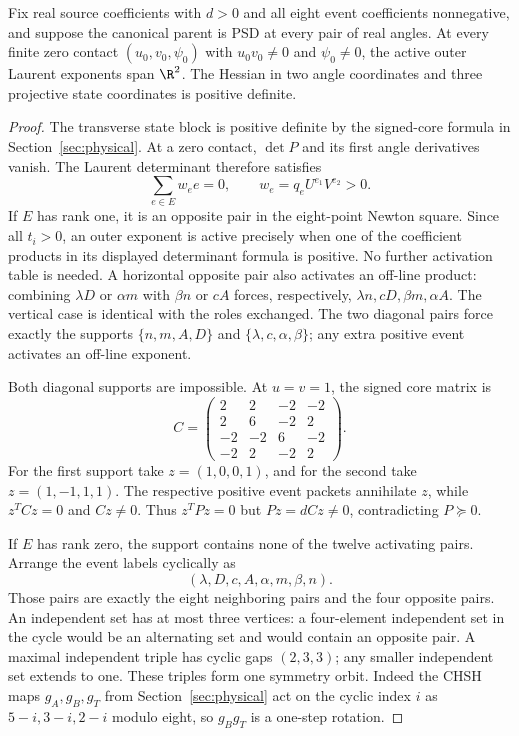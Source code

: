 \begin{theorem}\label{thm:curvature}
Fix real source coefficients with $d>0$ and all eight event coefficients nonnegative, and suppose the canonical parent is PSD at every pair of real angles. At every finite zero contact $(u_0,v_0,\psi_0)$ with $u_0v_0\ne0$ and $\psi_0\ne0$, the active outer Laurent exponents span $\R^2$. The Hessian in two angle coordinates and three projective state coordinates is positive definite.
\end{theorem}
\begin{proof}
The transverse state block is positive definite by the signed-core formula in Section~\ref{sec:physical}. At a zero contact, $\det P$ and its first angle derivatives vanish. The Laurent determinant therefore satisfies
\[
\sum_{e\in E}w_e e=0,\qquad w_e=q_eU^{e_1}V^{e_2}>0.
\]
If $E$ has rank one, it is an opposite pair in the eight-point Newton square. Since all $t_i>0$, an outer exponent is active precisely when one of the coefficient products in its displayed determinant formula is positive. No further activation table is needed.
A horizontal opposite pair also activates an off-line product: combining $\lambda D$ or $\alpha m$ with $\beta n$ or $cA$ forces, respectively, $\lambda n,cD,\beta m,\alpha A$. The vertical case is identical with the roles exchanged. The two diagonal pairs force exactly the supports $\{n,m,A,D\}$ and $\{\lambda,c,\alpha,\beta\}$; any extra positive event activates an off-line exponent.

Both diagonal supports are impossible. At $u=v=1$, the signed core matrix is
\[
C=\begin{pmatrix}2&2&-2&-2\\2&6&-2&2\\-2&-2&6&-2\\-2&2&-2&2\end{pmatrix}.
\]
For the first support take $z=(1,0,0,1)$, and for the second take $z=(1,-1,1,1)$. The respective positive event packets annihilate $z$, while $z^TCz=0$ and $Cz\ne0$. Thus $z^TPz=0$ but $Pz=dCz\ne0$, contradicting $P\succeq0$.

If $E$ has rank zero, the support contains none of the twelve activating pairs. Arrange the event labels cyclically as
\[
(\lambda,D,c,A,\alpha,m,\beta,n).
\]
Those pairs are exactly the eight neighboring pairs and the four opposite pairs. An independent set has at most three vertices: a four-element independent set in the cycle would be an alternating set and would contain an opposite pair. A maximal independent triple has cyclic gaps $(2,3,3)$; any smaller independent set extends to one. These triples form one symmetry orbit. Indeed the CHSH maps $g_A,g_B,g_T$ from Section~\ref{sec:physical} act on the cyclic index $i$ as $5-i,3-i,2-i$ modulo eight, so $g_Bg_T$ is a one-step rotation.


\end{proof}

